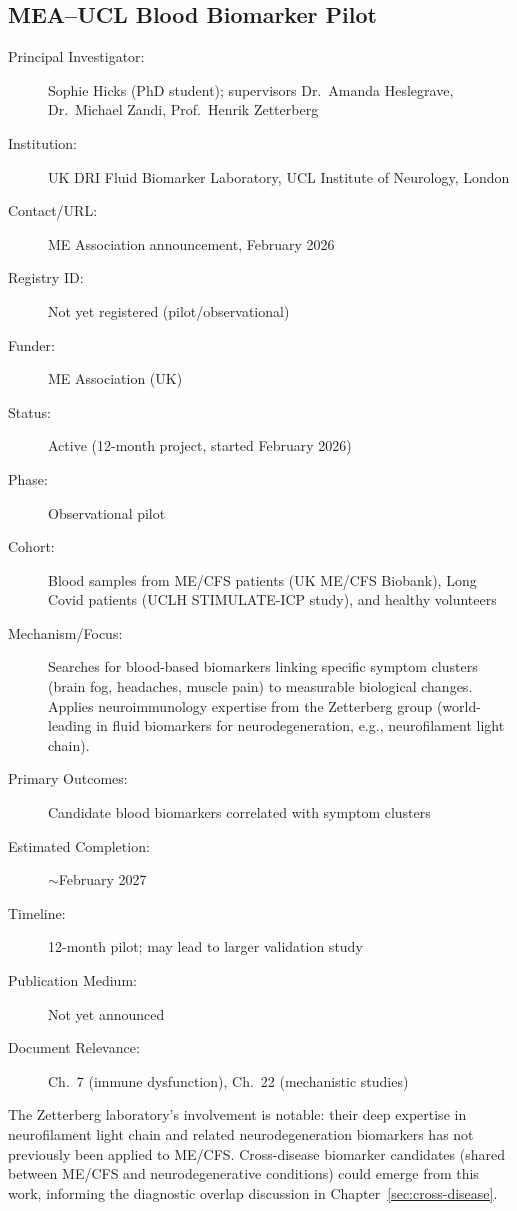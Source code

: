\subsection{MEA--UCL Blood Biomarker Pilot}
\label{sec:registry-mea-ucl}

\begin{description}
    \item[Principal Investigator:] Sophie Hicks (PhD student); supervisors
        Dr.\ Amanda Heslegrave, Dr.\ Michael Zandi, Prof.\ Henrik Zetterberg
    \item[Institution:] UK DRI Fluid Biomarker Laboratory, UCL Institute of
        Neurology, London
    \item[Contact/URL:] ME Association announcement, February 2026
    \item[Registry ID:] Not yet registered (pilot/observational)
    \item[Funder:] ME Association (UK)
    \item[Status:] Active (12-month project, started February 2026)
    \item[Phase:] Observational pilot
    \item[Cohort:] Blood samples from ME/CFS patients (UK ME/CFS Biobank),
        Long Covid patients (UCLH STIMULATE-ICP study), and healthy volunteers
    \item[Mechanism/Focus:] Searches for blood-based biomarkers linking
        specific symptom clusters (brain fog, headaches, muscle pain) to
        measurable biological changes.  Applies neuroimmunology expertise
        from the Zetterberg group (world-leading in fluid biomarkers for
        neurodegeneration, e.g., neurofilament light chain).
    \item[Primary Outcomes:] Candidate blood biomarkers correlated with
        symptom clusters
    \item[Estimated Completion:] $\sim$February 2027
    \item[Timeline:] 12-month pilot; may lead to larger validation study
    \item[Publication Medium:] Not yet announced
    \item[Document Relevance:] Ch.~7 (immune dysfunction),
        Ch.~22 (mechanistic studies)
\end{description}

The Zetterberg laboratory's involvement is notable: their deep expertise in
neurofilament light chain and related neurodegeneration biomarkers has not
previously been applied to ME/CFS.  Cross-disease biomarker candidates
(shared between ME/CFS and neurodegenerative conditions) could emerge from
this work, informing the diagnostic overlap discussion in
Chapter~\ref{sec:cross-disease}.

